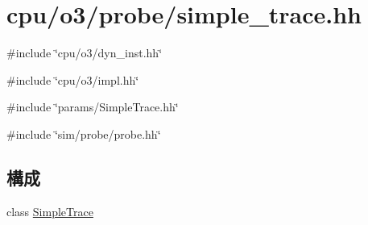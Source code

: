 \hypertarget{simple__trace_8hh}{
\section{cpu/o3/probe/simple\_\-trace.hh}
\label{simple__trace_8hh}
}
{\ttfamily \#include \char`\"{}cpu/o3/dyn\_\-inst.hh\char`\"{}}\par
{\ttfamily \#include \char`\"{}cpu/o3/impl.hh\char`\"{}}\par
{\ttfamily \#include \char`\"{}params/SimpleTrace.hh\char`\"{}}\par
{\ttfamily \#include \char`\"{}sim/probe/probe.hh\char`\"{}}\par
\subsection*{構成}
\begin{DoxyCompactItemize}
\item 
class \hyperlink{classSimpleTrace}{SimpleTrace}
\end{DoxyCompactItemize}
